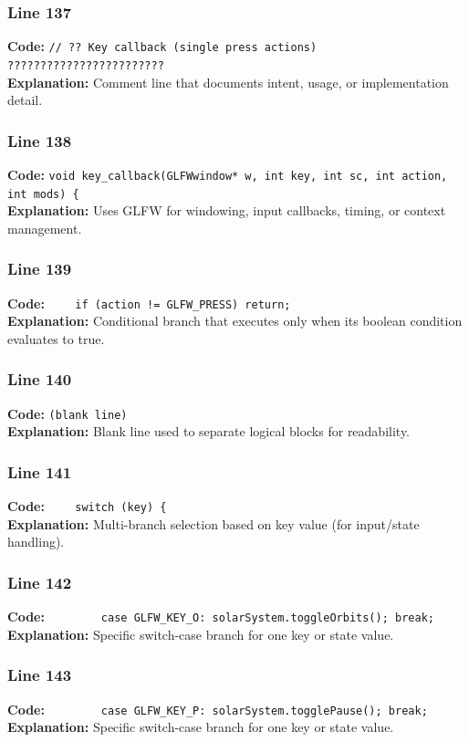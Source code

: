 \documentclass[11pt,a4paper]{article}
\begin{document}
\subsubsection*{Line 137}
\textbf{Code:} \verb|// ?? Key callback (single press actions) ????????????????????????|\\
\textbf{Explanation:} Comment line that documents intent, usage, or implementation detail.

\subsubsection*{Line 138}
\textbf{Code:} \verb|void key_callback(GLFWwindow* w, int key, int sc, int action, int mods) {|\\
\textbf{Explanation:} Uses GLFW for windowing, input callbacks, timing, or context management.

\subsubsection*{Line 139}
\textbf{Code:} \verb|    if (action != GLFW_PRESS) return;|\\
\textbf{Explanation:} Conditional branch that executes only when its boolean condition evaluates to true.

\subsubsection*{Line 140}
\textbf{Code:} \texttt{(blank line)}\\
\textbf{Explanation:} Blank line used to separate logical blocks for readability.

\subsubsection*{Line 141}
\textbf{Code:} \verb|    switch (key) {|\\
\textbf{Explanation:} Multi-branch selection based on key value (for input/state handling).

\subsubsection*{Line 142}
\textbf{Code:} \verb|        case GLFW_KEY_O: solarSystem.toggleOrbits(); break;|\\
\textbf{Explanation:} Specific switch-case branch for one key or state value.

\subsubsection*{Line 143}
\textbf{Code:} \verb|        case GLFW_KEY_P: solarSystem.togglePause(); break;|\\
\textbf{Explanation:} Specific switch-case branch for one key or state value.
\end{document}
